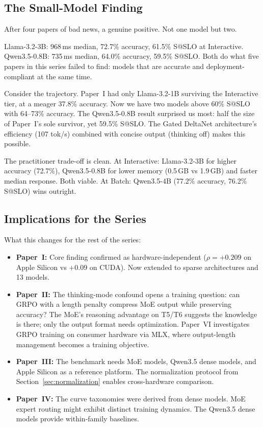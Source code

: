 \documentclass[11pt]{article}
\begin{document}
\subsection{The Small-Model Finding}

After four papers of bad news, a genuine positive.  Not one model but two.

Llama-3.2-3B: 968\,ms median, 72.7\% accuracy, 61.5\% S@SLO at Interactive.  Qwen3.5-0.8B: 735\,ms median, 64.0\% accuracy, 59.5\% S@SLO.  Both do what five papers in this series failed to find: models that are accurate and deployment-compliant at the same time.

Consider the trajectory.  Paper~I had only Llama-3.2-1B surviving the Interactive tier, at a meager 37.8\% accuracy.  Now we have two models above 60\% S@SLO with 64--73\% accuracy.  The Qwen3.5-0.8B result surprised us most: half the size of Paper~I's sole survivor, yet 59.5\% S@SLO.  The Gated DeltaNet architecture's efficiency (107 tok/s) combined with concise output (thinking off) makes this possible.

The practitioner trade-off is clean.  At Interactive: Llama-3.2-3B for higher accuracy (72.7\%), Qwen3.5-0.8B for lower memory (0.5\,GB vs 1.9\,GB) and faster median response.  Both viable.  At Batch: Qwen3.5-4B (77.2\% accuracy, 76.2\% S@SLO) wins outright.

\subsection{Implications for the Series}

What this changes for the rest of the series:

\begin{itemize}[leftmargin=12pt]
    \item \textbf{Paper~I:} Core finding confirmed as hardware-independent ($\rho = +0.209$ on Apple Silicon vs $+0.09$ on CUDA).  Now extended to sparse architectures and 13 models.

    \item \textbf{Paper~II:} The thinking-mode confound opens a training question: can GRPO with a length penalty compress MoE output while preserving accuracy?  The MoE's reasoning advantage on T5/T6 suggests the knowledge is there; only the output format needs optimization.  Paper~VI investigates GRPO training on consumer hardware via MLX, where output-length management becomes a training objective.

    \item \textbf{Paper~III:} The benchmark needs MoE models, Qwen3.5 dense models, and Apple Silicon as a reference platform.  The normalization protocol from Section~\ref{sec:normalization} enables cross-hardware comparison.

    \item \textbf{Paper~IV:} The curve taxonomies were derived from dense models.  MoE expert routing might exhibit distinct training dynamics.  The Qwen3.5 dense models provide within-family baselines.
\end{itemize}
\end{document}
